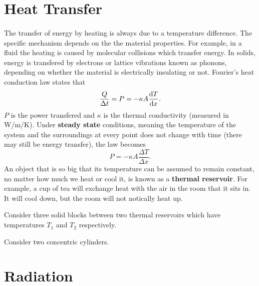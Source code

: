 \documentclass[../thermodynamics.tex]{subfiles}
\begin{document}
    \section{Heat Transfer}
        \paragraph{}
        The transfer of energy by heating is always due to a temperature difference.
        The specific mechanism depends on the the material properties.
        For example, in a fluid the heating is caused by molecular collisions which transfer energy.
        In solids, energy is transfered by electrons or lattice vibrations known as phonons, depending on whether the material is electrically insulating or not.
        Fourier's heat conduction law states that
        \begin{equation}
            \frac{Q}{\Delta t}=P=-\kappa A\frac{\mathrm{d}T}{\mathrm{d}x}.
        \end{equation}
        $P$ is the power transfered and $\kappa$ is the thermal conductivity (measured in W/m/K).
        Under \textbf{steady state} conditions, meaning the temperature of the system and the surroundings at every point does not change with time (there may still be energy transfer), the law becomes
        \begin{equation}
            P=-\kappa A\frac{\Delta T}{\Delta x}.
        \end{equation}
        An object that is so big that its temperature can be assumed to remain constant, no matter how much we heat or cool it, is known as a \textbf{thermal reservoir}.
        For example, a cup of tea will exchange heat with the air in the room that it sits in. It will cool down, but the room will not notically heat up.
        \begin{example}
            Consider three solid blocks between two thermal reservoirs which have temperatures $T_1$ and $T_2$ respectively.
        \end{example}
        \begin{example}
            Consider two concentric cylinders.
        \end{example}

    \section{Radiation}
\end{document}
